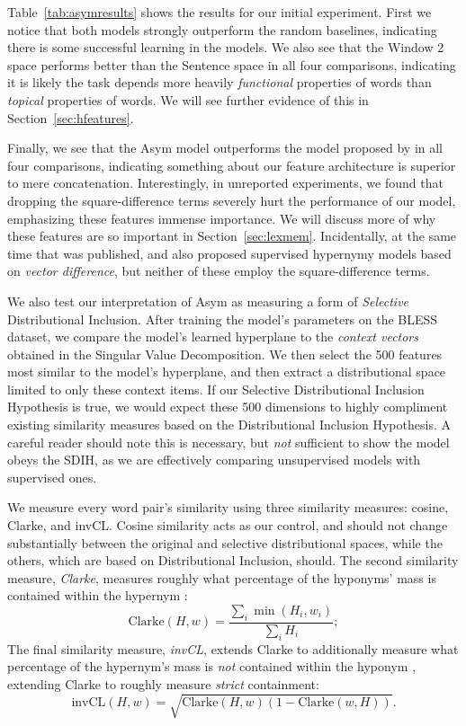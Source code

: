 \documentclass[12pt]{article}
\begin{document}
Table~\ref{tab:asymresults} shows the results for our initial experiment.
First we notice that both models strongly outperform the random baselines,
indicating there is some successful learning in the models. We also see that
the Window 2 space performs better than the Sentence space in all four
comparisons, indicating it is likely the task depends more heavily {\em
functional} properties of words than {\em topical} properties of words. We will
see further evidence of this in Section~\ref{sec:hfeatures}.

Finally, we see that the Asym model outperforms the model proposed by
 in all four comparisons, indicating something about
our feature architecture is superior to mere concatenation. Interestingly,
in unreported experiments, we found that dropping the square-difference terms
severely hurt the performance of our model, emphasizing these features
immense importance. We will discuss more of why these features are so
important in Section~\ref{sec:lexmem}. Incidentally, at the same time that
 was published,  and
 also proposed supervised hypernymy models based on
{\em vector difference}, but neither of these employ the square-difference
terms.

We also test our interpretation of Asym as measuring a form of {\em Selective}
Distributional Inclusion. After training the model's parameters on the BLESS
dataset, we compare the model's learned hyperplane to the {\em context
vectors} obtained in the Singular Value Decomposition. We then select the 500
features most similar to the model's hyperplane, and then extract a
distributional space limited to only these context items. If our Selective
Distributional Inclusion Hypothesis is true, we would expect these 500
dimensions to highly compliment existing similarity measures based on the
Distributional Inclusion Hypothesis. A careful reader should note this is
necessary, but {\em not} sufficient to show the model obeys the SDIH, as we are
effectively comparing unsupervised models with supervised ones.

We measure every word pair's similarity using three similarity measures:
cosine, Clarke, and invCL. Cosine similarity acts as our control, and
should not change substantially between the
original and selective distributional spaces, while the others, which are
based on Distributional Inclusion, should. The second similarity measure,
{\em Clarke}, measures roughly what percentage of the hyponyms' mass is contained
within the hypernym \cite{clarke:2009:gems}:
\begin{equation*}
  \text{Clarke}(H, w) = \frac{\sum_i \min(H_i, w_i)}{\sum_i H_i};
\end{equation*}
The final similarity measure, {\em invCL}, extends Clarke to additionally
measure what percentage of the hypernym's mass is {\em not} contained within
the hyponym \cite{lenci:2012:starsem}, extending Clarke to roughly measure
{\em strict} containment:
\begin{equation*}
  \text{invCL}(H, w) = \sqrt{\text{Clarke}(H, w)(1 - \text{Clarke}(w, H))}.
\end{equation*}
\end{document}

